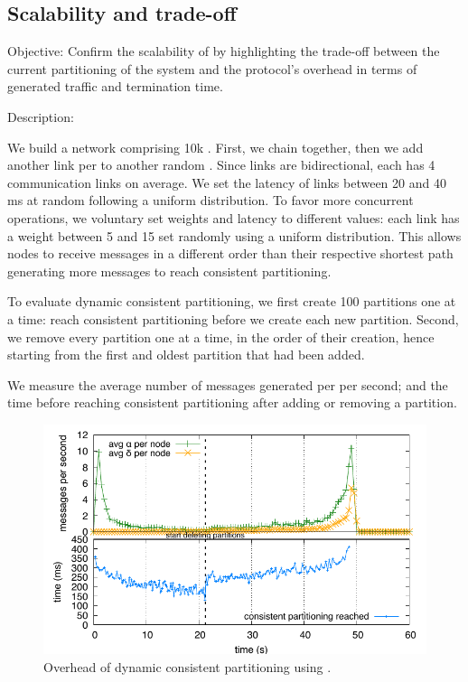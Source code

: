 \subsection{Scalability and trade-off}
\begin{asparadesc}
\item [Objective:] Confirm the scalability of \NAME by highlighting the
  trade-off between the current partitioning of the system and the
  protocol's overhead in terms of generated traffic and termination
  time.
  
\item [Description:]
  
We build a network comprising 10k \processes. First, we chain
\processes together, then we add another link per
\process to another random \process. Since links are bidirectional,
each \process has 4 communication links on average. We set the latency
of links between 20 and 40 ms at random following a uniform
distribution.
%
To favor more concurrent operations, we voluntary set
weights and latency to different values: each link has a weight
between 5 and 15 set randomly using a uniform distribution. This
allows nodes to receive messages in a different order than their
respective shortest path generating more messages to reach consistent
partitioning.


\noindent To evaluate dynamic consistent partitioning, we first
create 100 partitions one at a time: \processes reach consistent
partitioning before we create each new partition. Second, we remove
every partition one at a time, in the order of their creation, hence
starting from the first and oldest partition that had been added.

\noindent We measure the average number of messages generated per
\process per second; and the time before reaching consistent
partitioning after adding or removing a partition.

\begin{figure}
  \centering\includegraphics[width=\FIGSCALE\columnwidth]{img/as_cast_complexity.pdf}
  \caption{\label{fig:complexity}Overhead of dynamic consistent partitioning
    using \NAME.}
  

\end{figure}
\end{asparadesc}
